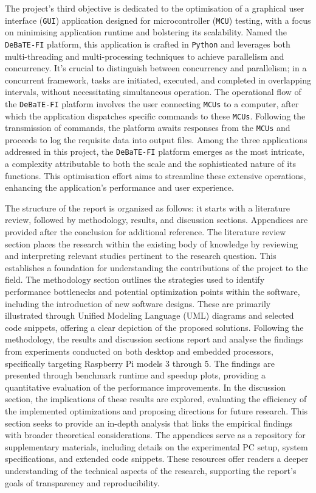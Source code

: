 \documentclass[12pt, openany]{book}
\begin{document}
The project's third objective is dedicated to the optimisation of a graphical user interface (\texttt{GUI}) application designed for microcontroller (\texttt{MCU}) testing, with a focus on minimising application runtime and bolstering its scalability. Named the \texttt{DeBaTE-FI} platform\cite{debate_fi_publication}, this application is crafted in \texttt{Python} and leverages both multi-threading and multi-processing techniques to achieve parallelism and concurrency. It's crucial to distinguish between concurrency and parallelism; in a concurrent framework, tasks are initiated, executed, and completed in overlapping intervals, without necessitating simultaneous operation. The operational flow of the \texttt{DeBaTE-FI} platform involves the user connecting \texttt{MCUs} to a computer, after which the application dispatches specific commands to these \texttt{MCUs}. Following the transmission of commands, the platform awaits responses from the \texttt{MCUs} and proceeds to log the requisite data into output files. Among the three applications addressed in this project, the \texttt{DeBaTE-FI} platform emerges as the most intricate, a complexity attributable to both the scale and the sophisticated nature of its functions. This optimisation effort aims to streamline these extensive operations, enhancing the application's performance and user experience.

The structure of the report is organized as follows: it starts with a literature review, followed by methodology, results, and discussion sections. Appendices are provided after the conclusion for additional reference. The literature review section places the research within the existing body of knowledge by reviewing and interpreting relevant studies pertinent to the research question. This establishes a foundation for understanding the contributions of the project to the field. The methodology section outlines the strategies used to identify performance bottlenecks and potential optimization points within the software, including the introduction of new software designs. These are primarily illustrated through Unified Modeling Language (UML) diagrams and selected code snippets, offering a clear depiction of the proposed solutions. Following the methodology, the results and discussion sections report and analyse the findings from experiments conducted on both desktop and embedded processors, specifically targeting Raspberry Pi models 3 through 5. The findings are presented through benchmark runtime and speedup plots, providing a quantitative evaluation of the performance improvements. In the discussion section, the implications of these results are explored, evaluating the efficiency of the implemented optimizations and proposing directions for future research. This section seeks to provide an in-depth analysis that links the empirical findings with broader theoretical considerations. The appendices serve as a repository for supplementary materials, including details on the experimental PC setup, system specifications, and extended code snippets. These resources offer readers a deeper understanding of the technical aspects of the research, supporting the report's goals of transparency and reproducibility. 
\end{document}
